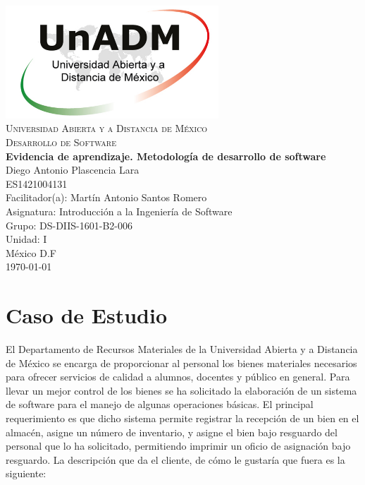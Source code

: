 \documentclass[spanish,12pt,letterpapper]{article}
\begin{document}
	\begin{titlepage}
		\begin{center}
			\includegraphics[width=0.6\textwidth]{../logoUnADM}~\\[1cm] 
			\textsc{Universidad Abierta y a Distancia de México}\\[0.8cm]
			\textsc{Desarrollo de Software}\\[1.8cm]
			
			\textbf{ \Large Evidencia de aprendizaje. Metodología de desarrollo de software}\\[3cm]
			
			Diego Antonio Plascencia Lara\\ ES1421004131 \\[0.4cm]
			Facilitador(a): Martín Antonio Santos Romero\\
			Asignatura: Introducción a la Ingeniería de Software\\
			Grupo: DS-DIIS-1601-B2-006 \\
			Unidad: I \\
			
			\vfill México D.F\\{\today}
			
		\end{center}
	\end{titlepage}
	
	\section{Caso de Estudio}
	
	El Departamento de Recursos Materiales de la Universidad Abierta y a Distancia de México se encarga de proporcionar al personal los bienes materiales necesarios para ofrecer servicios de calidad a alumnos, docentes y público en general. Para llevar un mejor control de los bienes se ha solicitado la elaboración de un sistema de software para el manejo de algunas operaciones básicas. El principal requerimiento es que dicho sistema permite registrar la recepción de un bien en el almacén, asigne un número de inventario, y asigne el bien bajo resguardo del personal que lo ha solicitado, permitiendo imprimir un oficio de asignación bajo resguardo. La descripción que da el cliente, de cómo le gustaría que fuera es la siguiente: \\
	
\end{document}
